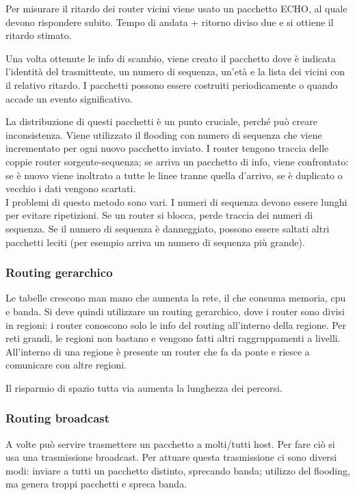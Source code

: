 Per misurare il ritardo dei router vicini viene usato un pacchetto ECHO, al quale devono rispondere subito.
Tempo di andata + ritorno diviso due e si ottiene il ritardo stimato.

Una volta ottenute le info di scambio, viene creato il pacchetto dove è indicata l'identità del trasmittente, un numero di sequenza, un'età e la lista dei vicini con il relativo ritardo.
I pacchetti possono essere costruiti periodicamente o quando accade un evento significativo.

La distribuzione di questi pacchetti è un punto cruciale, perché può creare inconsistenza.
Viene utilizzato il flooding con numero di sequenza che viene incrementato per ogni nuovo pacchetto inviato.
I router tengono traccia delle coppie router sorgente-sequenza;
se arriva un pacchetto di info, viene confrontato: se è nuovo viene inoltrato a tutte le linee tranne quella d'arrivo, se è duplicato o vecchio i dati vengono scartati.\\
I problemi di questo metodo sono vari.
I numeri di sequenza devono essere lunghi per evitare ripetizioni.
Se un router si blocca, perde traccia dei numeri di sequenza.
Se il numero di sequenza è danneggiato, possono essere saltati altri pacchetti leciti (per esempio arriva un numero di sequenza più grande).

\subsubsection{Routing gerarchico}
Le tabelle crescono man mano che aumenta la rete, il che consuma memoria, cpu e banda.
Si deve quindi utilizzare un routing gerarchico, dove i router sono divisi in regioni:
i router conoscono solo le info del routing all'interno della regione.
Per reti grandi, le regioni non bastano e vengono fatti altri raggruppamenti a livelli.
All'interno di una regione è presente un router che fa da ponte e riesce a comunicare con altre regioni.

Il risparmio di spazio tutta via aumenta la lunghezza dei percorsi.

\subsubsection{Routing broadcast}
A volte può servire trasmettere un pacchetto a molti/tutti host.
Per fare ciò si usa una trasmissione broadcast. 
Per attuare questa trasmissione ci sono diversi modi:
inviare a tutti un pacchetto distinto, sprecando banda;
utilizzo del flooding, ma genera troppi pacchetti e spreca banda.

